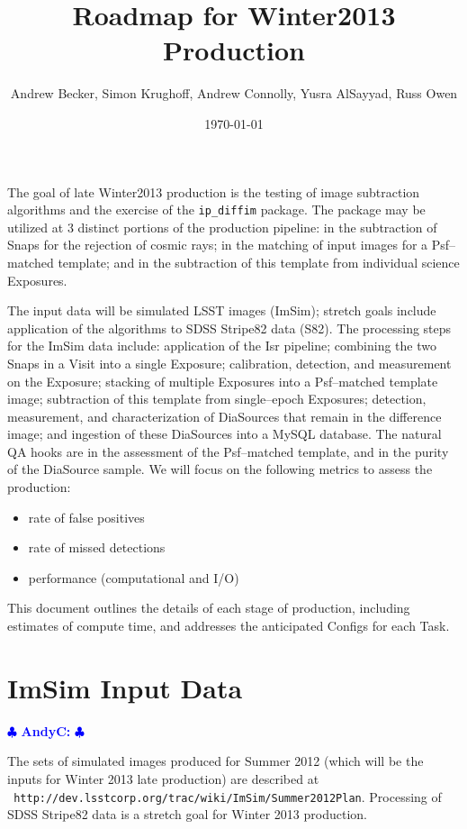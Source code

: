 \documentclass[12pt]{article}
\author{Andrew Becker, Simon Krughoff, Andrew Connolly, Yusra AlSayyad, Russ Owen}
\title{Roadmap for Winter2013 Production}
\date{\today}
\newcommand{\ajc} { \textcolor{blue} {
\ensuremath{\clubsuit} {\bf AndyC:}  
\ensuremath{\clubsuit} } }
\begin{document}
\maketitle

The goal of late Winter2013 production is the testing of image
subtraction algorithms and the exercise of the {\tt ip\_diffim}
package.  The package may be utilized at 3 distinct portions of the
production pipeline: in the subtraction of Snaps for the rejection of
cosmic rays; in the matching of input images for a Psf--matched
template; and in the subtraction of this template from individual
science Exposures.

The input data will be simulated LSST images (ImSim); stretch goals
include application of the algorithms to SDSS Stripe82 data (S82).
The processing steps for the ImSim data include: application of the
Isr pipeline; combining the two Snaps in a Visit into a single
Exposure; calibration, detection, and measurement on the Exposure;
stacking of multiple Exposures into a Psf--matched template image;
subtraction of this template from single--epoch Exposures; detection,
measurement, and characterization of DiaSources that remain in the
difference image; and ingestion of these DiaSources into a MySQL
database.  The natural QA hooks are in the assessment of the
Psf--matched template, and in the purity of the DiaSource sample.  We
will focus on the following metrics to assess the production:
\begin{itemize}
\item rate of false positives
\item rate of missed detections
\item performance (computational and I/O)
\end{itemize}
This document outlines the details of each stage of production,
including estimates of compute time, and addresses the anticipated
Configs for each Task.

\clearpage
\tableofcontents
\clearpage


\clearpage 
\section{ImSim Input Data} \ajc

The sets of simulated images produced for Summer 2012 (which will be
the inputs for Winter 2013 late production) are described at \\{\tt
  http://dev.lsstcorp.org/trac/wiki/ImSim/Summer2012Plan}.  Processing
of SDSS Stripe82 data is a stretch goal for Winter 2013 production.
\end{document}
